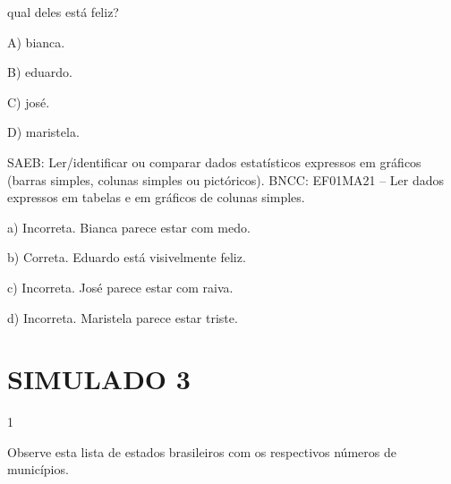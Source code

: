 qual deles está feliz?

A) bianca.

B) eduardo.

C) josé.

D) maristela.

SAEB: Ler/identificar ou comparar dados estatísticos expressos
em gráficos (barras simples, colunas simples ou pictóricos).
BNCC: EF01MA21 -- Ler dados expressos em tabelas e em gráficos de colunas
simples.

a) Incorreta. Bianca parece estar com medo.

b) Correta. Eduardo está visivelmente feliz.

c) Incorreta. José parece estar com raiva.

d) Incorreta. Maristela parece estar triste.

\chapter{SIMULADO 3}

\num{1}

Observe esta lista de estados brasileiros com os respectivos números de municípios.


